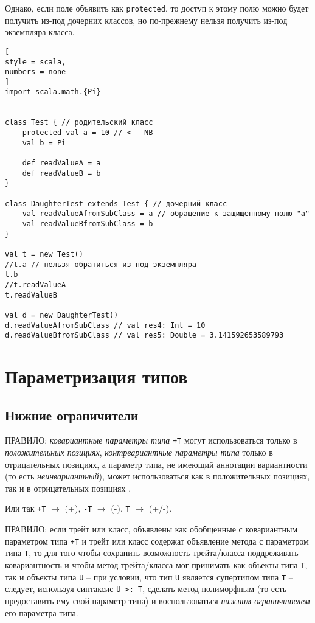 \documentclass[%
	11pt,
	a4paper,
	utf8,
		]{article}
\begin{document}
Однако, если поле объявить как \texttt{protected}, то доступ к этому полю можно будет получить из-под дочерних классов, но по-прежнему нельзя получить из-под экземпляра класса.
\begin{lstlisting}[
style = scala,
numbers = none	
]
import scala.math.{Pi}


class Test { // родительский класс
	protected val a = 10 // <-- NB
	val b = Pi
	
	def readValueA = a
	def readValueB = b
}

class DaughterTest extends Test { // дочерний класс
	val readValueAfromSubClass = a // обращение к защищенному полю "a"
	val readValueBfromSubClass = b
}

val t = new Test()
//t.a // нельзя обратиться из-под экземпляра
t.b
//t.readValueA
t.readValueB

val d = new DaughterTest()
d.readValueAfromSubClass // val res4: Int = 10
d.readValueBfromSubClass // val res5: Double = 3.141592653589793
\end{lstlisting}

\section{Параметризация типов}

\subsection{Нижние ограничители}

ПРАВИЛО: \emph{ковариантные параметры типа} \texttt{+T} могут использоваться только в \emph{положительных позициях}, \emph{контрвариантные параметры типа} только в отрицательных позициях, а параметр типа, не имеющий аннотации вариантности (то есть \emph{неинвариантный}), может использоваться как в положительных позициях, так и в отрицательных позициях \cite[]{odersky:scala-2020}.

Или так \texttt{+T} $\rightarrow$ (+), \texttt{-T} $\rightarrow$ (-), \texttt{T} $\rightarrow$ (+/-).

ПРАВИЛО: если трейт или класс, объявлены как обобщенные с ковариантным параметром типа \texttt{+T} и трейт или класс содержат объявление метода с параметром типа \texttt{T}, то для того чтобы сохранить возможность трейта/класса поддреживать ковариантность и чтобы метод трейта/класса мог принимать как объекты типа \texttt{T}, так и объекты типа \texttt{U} -- при условии, что тип \texttt{U} является супертипом типа \texttt{T} -- следует, используя синтаксис \texttt{U >: T}, сделать метод полиморфным (то есть предоставить ему свой параметр типа) и воспользоваться \emph{нижним ограничителем} его параметра типа.
\end{document}
